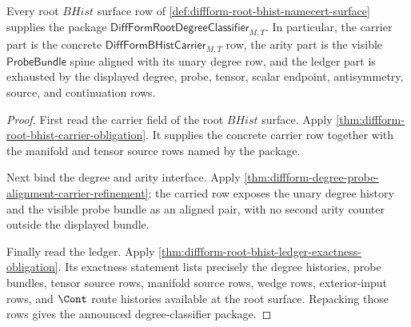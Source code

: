 \begin{theorem}
\label{thm:diffform-root-degree-classifier-coverage}
Every root $BHist$ surface row of
\autoref{def:diffform-root-bhist-namecert-surface} supplies the package
$\mathsf{DiffFormRootDegreeClassifier}_{M,T}$. In particular, the carrier
part is the concrete $\mathsf{DiffFormBHistCarrier}_{M,T}$ row, the arity
part is the visible $\mathsf{ProbeBundle}$ spine aligned with its unary
degree row, and the ledger part is exhausted by the displayed degree, probe,
tensor, scalar endpoint, antisymmetry, source, and continuation rows.
\end{theorem}
\begin{proof}
First read the carrier field of the root $BHist$ surface. Apply
\autoref{thm:diffform-root-bhist-carrier-obligation}. It supplies the
concrete carrier row together with the manifold and tensor source rows named
by the package.

Next bind the degree and arity interface. Apply
\autoref{thm:diffform-degree-probe-alignment-carrier-refinement}; the carried
row exposes the unary degree history and the visible probe bundle as an
aligned pair, with no second arity counter outside the displayed bundle.

Finally read the ledger. Apply
\autoref{thm:diffform-root-bhist-ledger-exactness-obligation}. Its exactness
statement lists precisely the degree histories, probe bundles, tensor source
rows, manifold source rows, wedge rows, exterior-input rows, and $\Cont$
route histories available at the root surface. Repacking those rows gives the
announced degree-classifier package.
\end{proof}


